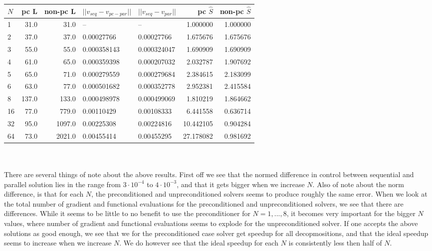 \begin{tabular}{lrrllrr}
\toprule
{}$N$ &  pc L &  non-pc L &       $||v_{seq}-v_{pc-par}||$ &  $||v_{seq}-v_{par}||$  &  pc $\hat{S}$ &  non-pc $\hat{S}$ \\
\midrule
1  &     31.0 &      31.0 &           -- &           -- &    1.000000 &        1.000000 \\
2  &     37.0 &      37.0 &   0.00027766 &   0.00027766 &    1.675676 &        1.675676 \\
3  &     55.0 &      55.0 &  0.000358143 &  0.000324047 &    1.690909 &        1.690909 \\
4  &     61.0 &      65.0 &  0.000359398 &  0.000207032 &    2.032787 &        1.907692 \\
5  &     65.0 &      71.0 &  0.000279559 &  0.000279684 &    2.384615 &        2.183099 \\
6  &     63.0 &      77.0 &  0.000501682 &  0.000352778 &    2.952381 &        2.415584 \\
8  &    137.0 &     133.0 &  0.000498978 &  0.000499069 &    1.810219 &        1.864662 \\
16 &     77.0 &     779.0 &   0.00110429 &   0.00108333 &    6.441558 &        0.636714 \\
32 &     95.0 &    1097.0 &   0.00225308 &   0.00224816 &   10.442105 &        0.904284 \\
64 &     73.0 &    2021.0 &   0.00455414 &   0.00455295 &   27.178082 &        0.981692 \\
\bottomrule
\end{tabular}
\\
\\
There are several things of note about the above results. First off we see that the normed difference in control between sequential and parallel solution lies in the range from $3\cdot 10^{-4}$ to $4\cdot 10^{-3}$, and that it gets bigger when we increase $N$. Also of note about the norm difference, is that for each $N$, the preconditioned and unpreconditioned solvers seems to produce roughly the same error. When we look at the total number of gradient and functional evaluations for the preconditioned and unpreconditioned solvers, we see that there are differences. While it seems to be little to no benefit to use the preconditioner for $N=1,...,8$, it becomes very important for the bigger $N$ values, where number of gradient and functional evaluations seems to explode for the unpreconditioned solver. If one accepts the above solutions as good enough, we see that we for the preconditioned case solver get speedup for all decopmositions, and that the ideal speedup seems to increase when we increase $N$. We do however see that the ideal speedup for each $N$ is consistently less then half of $N$.
